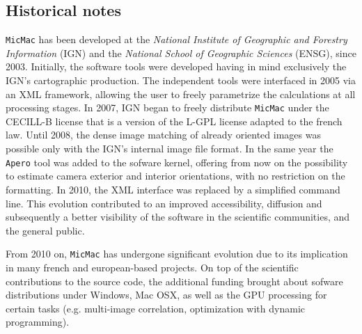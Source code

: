 \documentclass[twocolumn]{bmcart}%
\begin{document}
\subsection*{Historical notes}
{\tt MicMac} has been developed at the \textit{National Institute of Geographic and Forestry Information} (IGN) and the \textit{National School of Geographic Sciences} (ENSG), since 2003. Initially, the software tools were developed having in mind exclusively the IGN's cartographic production. The independent tools were interfaced in 2005 via an XML framework, allowing the user to freely parametrize the calculations at all processing stages. In 2007, IGN began to freely distribute {\tt MicMac} under the CECILL-B license that is a version of the L-GPL license adapted to the french law.  Until 2008, the dense image matching of already oriented images was possible only with the IGN's internal image file format. In the same year the {\tt Apero} tool was added to the sofware kernel, offering from now on the possibility to estimate camera exterior and interior orientations, with no restriction on the formatting. In 2010, the XML interface was replaced by a simplified command line. This evolution contributed to an improved accessibility, diffusion and subsequently a better visibility of the software in the scientific communities, and the general public.\par
From 2010 on, {\tt MicMac} has undergone significant evolution due to its implication in many french and european-based projects. On top of the scientific contributions to the source code, the additional funding brought about sofware distributions under Windows, Mac OSX, as well as the GPU processing for certain tasks (e.g. multi-image correlation, optimization with dynamic programming).
\end{document}

